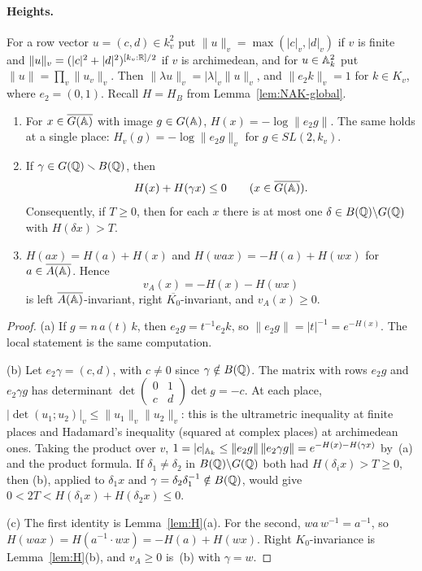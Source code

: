 \paragraph{Heights.} For a row vector $u=(c,d)\in k_v^2$ put
$\|u\|_v=\max(|c|_v,|d|_v)$ if $v$ is finite and
$\|u\|_v=(|c|^2+|d|^2)^{[k_v:\mathbb{R}]/2}$ if $v$ is archimedean, and for
$u\in\mathbb{A}_k^2$ put $\|u\|=\prod_v\|u_v\|_v$. Then $\|\lambda u\|_v=
|\lambda|_v\|u\|_v$, and $\|e_2k\|_v=1$ for $k\in K_v$, where
$e_2=(0,1)$. Recall $H=H_B$ from Lemma~\ref{lem:NAK-global}.

\begin{lemma}\label{lem:height-ineq}
\begin{enumerate}[label=(\alph*)]
\item For $x\in\overline{G(\mathbb{A})}$ with image $g\in G(\mathbb{A})$, $H(x)=-\log\|e_2g\|$.
  The same holds at a single place: $H_v(g)=-\log\|e_2g\|_v$ for
  $g\in SL(2,k_v)$.
\item If $\gamma\in G(\mathbb{Q})\smallsetminus B(\mathbb{Q})$, then
  \[
  H(x)+H(\gamma x)\le0\qquad(x\in\overline{G(\mathbb{A})}).
  \]
  Consequently, if $T\ge0$, then for each $x$ there is at most one
  $\delta\in B(\mathbb{Q})\backslash G(\mathbb{Q})$ with $H(\delta x)>T$.
\item $H(ax)=H(a)+H(x)$ and $H(wax)=-H(a)+H(wx)$ for
  $a\in\overline{A(\mathbb{A})}$. Hence
  \begin{equation}\label{eq:vA}
  v_A(x)=-H(x)-H(wx)
  \end{equation}
  is left $\overline{A(\mathbb{A})}$-invariant, right $\overline{K_0}$-invariant,
  and $v_A(x)\ge0$.
\end{enumerate}
\end{lemma}

\begin{proof}
(a) If $g=n\,a(t)\,k$, then $e_2g=t^{-1}e_2k$, so $\|e_2g\|=|t|^{-1}
=e^{-H(x)}$. The local statement is the same computation.

(b) Let $e_2\gamma=(c,d)$, with $c\ne0$ since $\gamma\notin B(\mathbb{Q})$. The
matrix with rows $e_2g$ and $e_2\gamma g$ has determinant
$\det\begin{pmatrix}0&1\\c&d\end{pmatrix}\det g=-c$. At each place,
$|\det(u_1;u_2)|_v\le\|u_1\|_v\|u_2\|_v$: this is the ultrametric
inequality at finite places and Hadamard's inequality (squared at complex
places) at archimedean ones. Taking the product over $v$,
$1=|c|_{\mathbb{A}_k}\le\|e_2g\|\,\|e_2\gamma g\|=e^{-H(x)-H(\gamma x)}$ by~(a)
and the product formula. If $\delta_1\ne\delta_2$ in $B(\mathbb{Q})\backslash
G(\mathbb{Q})$ both had $H(\delta_ix)>T\ge0$, then (b), applied to $\delta_1x$ and
$\gamma=\delta_2\delta_1^{-1}\notin B(\mathbb{Q})$, would give $0<2T<
H(\delta_1x)+H(\delta_2x)\le0$.

(c) The first identity is Lemma~\ref{lem:H}(a). For the second,
$wa\,w^{-1}=a^{-1}$, so $H(wax)=H(a^{-1}\cdot wx)=-H(a)+H(wx)$. Right
$K_0$-invariance is Lemma~\ref{lem:H}(b), and $v_A\ge0$ is~(b) with
$\gamma=w$.
\end{proof}

